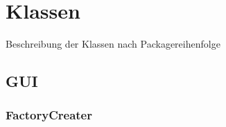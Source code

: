 \section{Klassen}
Beschreibung der Klassen nach Packagereihenfolge
\subsection{GUI}

\subsubsection{FactoryCreater}

